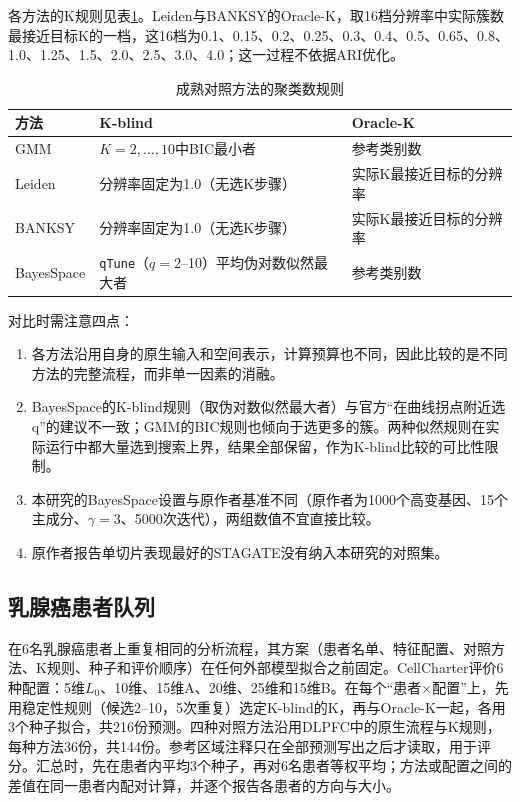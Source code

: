 各方法的K规则见表\ref{tab:cc-baseline-K-p1}。Leiden与BANKSY的Oracle-K，取16档分辨率中实际簇数最接近目标K的一档，这16档为0.1、0.15、0.2、0.25、0.3、0.4、0.5、0.65、0.8、1.0、1.25、1.5、2.0、2.5、3.0、4.0；这一过程不依据ARI优化。

\begin{table}[htbp]
\centering
\caption{成熟对照方法的聚类数规则}
\label{tab:cc-baseline-K-p1}
\small
\begin{tabularx}{\linewidth}{lXl}
\toprule
方法 & K-blind & Oracle-K\\
\midrule
GMM & $K=2,\ldots,10$中BIC最小者 & 参考类别数\\
Leiden & 分辨率固定为1.0（无选K步骤） & 实际K最接近目标的分辨率\\
BANKSY & 分辨率固定为1.0（无选K步骤） & 实际K最接近目标的分辨率\\
BayesSpace & \texttt{qTune}（$q=2$--10）平均伪对数似然最大者 & 参考类别数\\
\bottomrule
\end{tabularx}
\end{table}

对比时需注意四点：
\begin{enumerate}
  \item 各方法沿用自身的原生输入和空间表示，计算预算也不同，因此比较的是不同方法的完整流程，而非单一因素的消融。
  \item BayesSpace的K-blind规则（取伪对数似然最大者）与官方“在曲线拐点附近选q”的建议不一致\cite{bayesspacevignette}；GMM的BIC规则也倾向于选更多的簇。两种似然规则在实际运行中都大量选到搜索上界，结果全部保留，作为K-blind比较的可比性限制。
  \item 本研究的BayesSpace设置与原作者基准不同（原作者为1000个高变基因、15个主成分、$\gamma=3$、5000次迭代）\cite{varrone2024}，两组数值不宜直接比较。
  \item 原作者报告单切片表现最好的STAGATE\cite{dong2022stagate}没有纳入本研究的对照集。
\end{enumerate}

\subsection{乳腺癌患者队列}
\label{subsec:cc-external-p1}
在6名乳腺癌患者上重复相同的分析流程，其方案（患者名单、特征配置、对照方法、K规则、种子和评价顺序）在任何外部模型拟合之前固定。CellCharter评价6种配置：5维$L_0$、10维、15维A、20维、25维和15维B。在每个“患者×配置”上，先用稳定性规则（候选2--10，5次重复）选定K-blind的K，再与Oracle-K一起，各用3个种子拟合，共216份预测。四种对照方法沿用DLPFC中的原生流程与K规则，每种方法36份，共144份。参考区域注释只在全部预测写出之后才读取，用于评分。汇总时，先在患者内平均3个种子，再对6名患者等权平均；方法或配置之间的差值在同一患者内配对计算，并逐个报告各患者的方向与大小。

